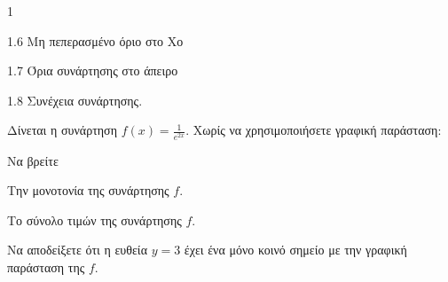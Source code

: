 \begin{ylh}{1}
    \item 1.6 Μη πεπερασμένο όριο στο Χο
    \item 1.7 Όρια συνάρτησης στο άπειρο
    \item 1.8 Συνέχεια συνάρτησης.
\end{ylh}
Δίνεται η συνάρτηση $f(x)=\frac{1}{e^{2x}}$. Χωρίς να χρησιμοποιήσετε γραφική παράσταση:
\begin{alist}
\item Να βρείτε
    \begin{rlist}
    \item Την μονοτονία της συνάρτησης $f$. 
    \item Το σύνολο τιμών της συνάρτησης $f$. 
    \end{rlist}
\item Να αποδείξετε ότι η ευθεία $y=3$ έχει ένα μόνο κοινό σημείο με την γραφική παράσταση της $f$. 
\end{alist}